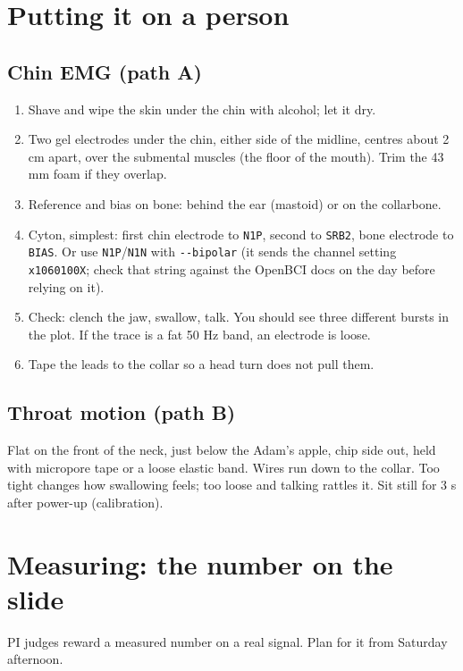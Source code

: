 \documentclass[10.5pt,a4paper]{article}
\newcommand{\f}[1]{\texttt{#1}}
\begin{document}
\section{Putting it on a person}
\subsection{Chin EMG (path A)}
\begin{enumerate}
\item Shave and wipe the skin under the chin with alcohol; let it dry.
\item Two gel electrodes under the chin, either side of the midline, centres about 2 cm apart, over the submental muscles (the floor of the mouth). Trim the 43 mm foam if they overlap.
\item Reference and bias on bone: behind the ear (mastoid) or on the collarbone.
\item Cyton, simplest: first chin electrode to \f{N1P}, second to \f{SRB2}, bone electrode to \f{BIAS}. Or use \f{N1P}/\f{N1N} with \f{-{}-bipolar} (it sends the channel setting \f{x1060100X}; check that string against the OpenBCI docs on the day before relying on it).
\item Check: clench the jaw, swallow, talk. You should see three different bursts in the plot. If the trace is a fat 50 Hz band, an electrode is loose.
\item Tape the leads to the collar so a head turn does not pull them.
\end{enumerate}

\subsection{Throat motion (path B)}
Flat on the front of the neck, just below the Adam's apple, chip side out, held with micropore tape or a loose elastic band. Wires run down to the collar. Too tight changes how swallowing feels; too loose and talking rattles it. Sit still for 3 s after power-up (calibration).

\section{Measuring: the number on the slide}\label{sec:measure}
PI judges reward a measured number on a real signal. Plan for it from Saturday afternoon.
\end{document}
